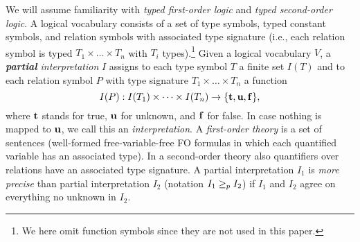 We will assume familiarity with \emph{typed first-order logic} and \emph{typed second-order logic}.  
A logical vocabulary consists of a set of type symbols, typed constant symbols, and relation symbols with associated type signature (i.e., each relation symbol is typed $T_1\times \dots \times T_n$ with $T_i$ types).\footnote{We here omit function symbols since they are not used in this paper.}
Given a logical vocabulary $V$, a \emph{\textbf{partial} interpretation} $I$ assigns to each type symbol $T$ a finite set $I(T)$ and to each 
relation symbol $P$ with type signature $T_1\times \dots \times T_n$ a function 
\[I(P): I(T_1)\times \dots \times I(T_n)\to \{\mathbf{t},\mathbf{u},\mathbf{f}\},\] 
where $\mathbf{t}$ stands for true, $\mathbf{u}$ for unknown, and $\mathbf{f}$ for false. In case nothing is mapped to $\mathbf{u}$, we call this an \emph{interpretation}.
A \emph{first-order theory} is a set of sentences (well-formed free-variable-free FO formulas in which each quantified variable has an associated type). 
In a second-order theory also quantifiers over relations have an associated type signature. 
A partial interpretation $I_1$ is \emph{more precise} than partial interpretation $I_2$ (notation $I_1\geq_p I_2$) if $I_1$ and $I_2$ agree on everything no unknown in $I_2$.
